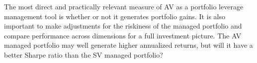 The most direct and practically relevant measure of AV as a portfolio leverage management tool is whether or not it generates portfolio gains. It is also important to make adjustments for the riskiness of the managed portfolio and compare performance across dimensions for a full investment picture. The AV managed portfolio may well generate higher annualized returns, but will it have a better Sharpe ratio than the SV managed portfolio?

